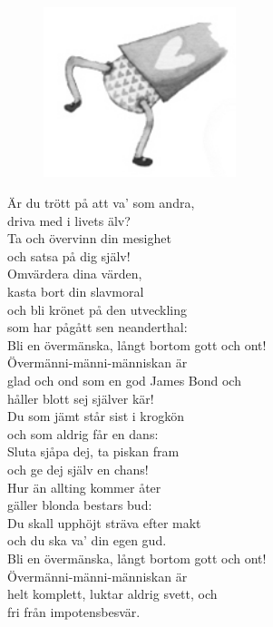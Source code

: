 \documentclass[a6paper,10pt]{article}
\begin{document}
\vspace{35pt}
\begin{figure}[!h]
\centering
\includegraphics[width=0.5\textwidth]{lingonben.png}
\end{figure}

\setlength{\oddsidemargin}{-0.37in}
\begin{center}
\end{center}
\begin{lyrics}
\small Är du trött på att va' som andra,\\ 
driva med i livets älv?\\ 
Ta och övervinn din mesighet\\ 
och satsa på dig själv!
\vspace{5pt}\\ 
Omvärdera dina värden,\\ 
kasta bort din slavmoral\\ 
och bli krönet på den utveckling\\ 
som har pågått sen neanderthal:
 \vspace{5pt}\\ 
Bli en övermänska, långt bortom gott och ont!\\ 
Övermänni-männi-människan är\\ 
glad och ond som en god James Bond och\\ 
håller blott sej själver kär!
\vspace{5pt}\\  
Du som jämt står sist i krogkön\\ 
och som aldrig får en dans:\\ 
Sluta sjåpa dej, ta piskan fram\\ 
och ge dej själv en chans!
\vspace{5pt}\\  
Hur än allting kommer åter\\ 
gäller blonda bestars bud:\\ 
Du skall upphöjt sträva efter makt\\ 
och du ska va' din egen gud.
\vspace{5pt}\\  
Bli en övermänska, långt bortom gott och ont!\\ 
Övermänni-männi-människan är\\ 
helt komplett, luktar aldrig svett, och\\ 
fri från impotensbesvär.
\end{lyrics}
\end{document}
